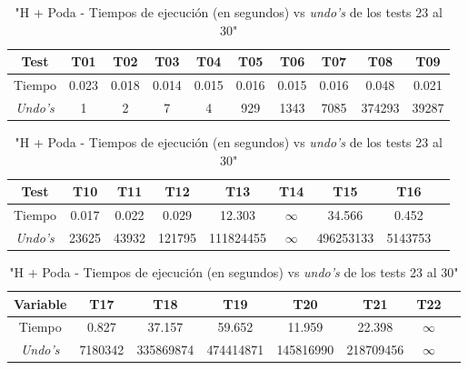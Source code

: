 \documentclass[12pt]{article}
\begin{document}
\begin{center}
\begin{table}[h]
    \end{table}
    \begin{table}[h]
        \caption{"H + Poda - Tiempos de ejecución (en segundos) vs \textit{undo's} de los tests 23 al 30"}
        \centering
        \begin{tabular} {| c | c | c | c | c | c | c | c | c | c |}
            \hline
            Test & T01 & T02 & T03 & T04 & T05 & T06 & T07 & T08 & T09 \\
            \hline
            Tiempo & 0.023 & 0.018 & 0.014 & 0.015 & 0.016 & 0.015 & 0.016 & 0.048 & 0.021 \\
            \textit{Undo's} & 1 & 2 & 7 & 4 & 929 & 1343 & 7085 & 374293 & 39287 \\
            \hline
        \end{tabular}
    \end{table}
    \begin{table}[h]
        \caption{"H + Poda - Tiempos de ejecución (en segundos) vs \textit{undo's} de los tests 23 al 30"}
        \centering
        \begin{tabular} {| c | c | c | c | c | c | c | c | c |}
            \hline
            Test & T10 & T11 & T12 & T13 & T14 & T15 & T16 \\
            \hline
            Tiempo & 0.017 & 0.022 & 0.029 & 12.303 & $\infty$ & 34.566 & 0.452 \\
            \textit{Undo's} & 23625 & 43932 & 121795 & 111824455 & $\infty$ & 496253133 & 5143753 \\
            \hline
        \end{tabular}
    \end{table}
    \begin{table}[h]
        \caption{"H + Poda - Tiempos de ejecución (en segundos) vs \textit{undo's} de los tests 23 al 30"}
        \centering
        \begin{tabular} {| c | c | c | c | c | c | c | c |}
            \hline
            Variable & T17 & T18 & T19 & T20 & T21 & T22 \\
            \hline
            Tiempo & 0.827 & 37.157 & 59.652 & 11.959 & 22.398 & $\infty$ \\
            \textit{Undo's} & 7180342 & 335869874 & 474414871 & 145816990 & 218709456 & $\infty$ \\
            \hline
        \end{tabular}
    \end{table}
    \begin{table}[h]

\end{table}
\end{center}
\end{document}

